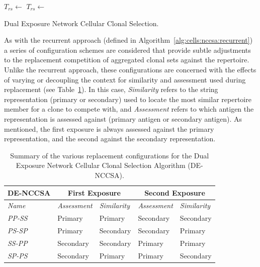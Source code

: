 \begin{algorithm}[htp]
  \SetLine  
  
	
	$T_{rs} \leftarrow$ \;		
	$T_{rs} \leftarrow$ \;		
	\;
	\caption{Dual Exposure Network Cellular Clonal Selection.}
	\label{alg:cells:nccsa:dual}	
\end{algorithm}	

As with the recurrent approach (defined in Algorithm~\ref{alg:cells:nccsa:recurrent}) a series of configuration schemes are considered that provide subtle adjustments to the replacement competition of aggregated clonal sets against the repertoire. Unlike the recurrent approach, these configurations are concerned with the effects of varying or decoupling the context for similarity and assessment used during replacement (see Table~\ref{tab:network:nccsa:denccsa:configuration}). In this case, \emph{Similarity} refers to the string representation (primary or secondary) used to locate the most similar repertoire member for a clone to compete with, and \emph{Assessment} refers to which antigen the representation is assessed against (primary antigen or secondary antigen). As mentioned, the first exposure is always assessed against the primary representation, and the second against the secondary representation.

\begin{table}[htp]
	\centering\small
		\begin{tabular}{lllll}
		\toprule
		\textbf{DE-NCCSA} & \multicolumn{2}{c}{\textbf{First Exposure}} & \multicolumn{2}{c}{\textbf{Second Exposure}} \\ 
		\midrule
		\emph{Name} & \emph{Assessment} & \emph{Similarity} & \emph{Assessment} & \emph{Similarity} \\ 
		\toprule
		\emph{PP-SS} & Primary & Primary & Secondary & Secondary \\ 
		\emph{PS-SP} & Primary & Secondary & Secondary & Primary \\				
		\emph{SS-PP} & Secondary & Secondary & Primary & Primary \\		
		\emph{SP-PS} & Secondary & Primary & Primary & Secondary \\						
		\bottomrule
		\end{tabular}
	\caption{Summary of the various replacement configurations for the Dual Exposure Network Cellular Clonal Selection Algorithm (DE-NCCSA).}
	\label{tab:network:nccsa:denccsa:configuration}
\end{table}


